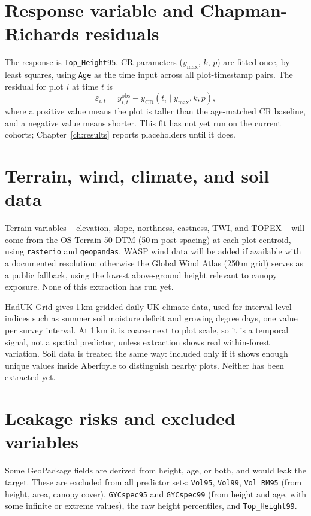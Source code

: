 \section{Response variable and Chapman-Richards residuals}

The response is \texttt{Top\_Height95}. CR parameters ($y_{\max}$, $k$, $p$) are fitted once, by least squares, using \texttt{Age} as the time input across all plot-timestamp pairs. The residual for plot $i$ at time $t$ is
\[
\varepsilon_{i,t} = y_{i,t}^{\text{obs}} - y_{\text{CR}}(t_i \mid y_{\max}, k, p),
\]
where a positive value means the plot is taller than the age-matched CR baseline, and a negative value means shorter. This fit has not yet run on the current cohorts; Chapter~\ref{ch:results} reports placeholders until it does.

\section{Terrain, wind, climate, and soil data}

Terrain variables -- elevation, slope, northness, eastness, TWI, and TOPEX -- will come from the OS Terrain 50 DTM \citep{osdatahub2026OSTerrain50} (50\,m post spacing) at each plot centroid, using \texttt{rasterio} and \texttt{geopandas}. WASP wind data will be added if available with a documented resolution; otherwise the Global Wind Atlas \citep{globalwindatlas2026GlobalWindAtlas} (250\,m grid) serves as a public fallback, using the lowest above-ground height relevant to canopy exposure. None of this extraction has run yet.

HadUK-Grid \citep{hollis2019HadUKGridGriddedClimate} gives 1\,km gridded daily UK climate data, used for interval-level indices such as summer soil moisture deficit and growing degree days, one value per survey interval. At 1\,km it is coarse next to plot scale, so it is a temporal signal, not a spatial predictor, unless extraction shows real within-forest variation. Soil data is treated the same way: included only if it shows enough unique values inside Aberfoyle to distinguish nearby plots. Neither has been extracted yet.

\section{Leakage risks and excluded variables}
\label{sec:data-leakage}

Some GeoPackage fields are derived from height, age, or both, and would leak the target. These are excluded from all predictor sets: \texttt{Vol95}, \texttt{Vol99}, \texttt{Vol\_RM95} (from height, area, canopy cover), \texttt{GYCspec95} and \texttt{GYCspec99} (from height and age, with some infinite or extreme values), the raw height percentiles, and \texttt{Top\_Height99}.

